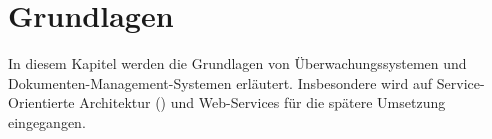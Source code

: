 \section{Grundlagen}
In diesem Kapitel werden die Grundlagen von Überwachungssystemen und Dokumenten-Management-Systemen erläutert.
Insbesondere wird auf Service-Orientierte Architektur () und Web-Services für die spätere Umsetzung eingegangen.














